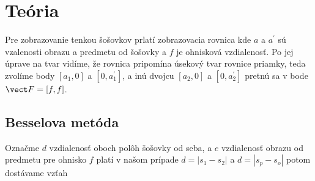 \section{Teória}

Pre zobrazovanie tenkou šošovkov prlatí zobrazovacia rovnica
kde $a$ a $a^\prime$ sú vzalenosti obrazu a predmetu od šošovky a $f$ je ohnisková vzdialenosť.
Po jej úprave na tvar
vidíme, že rovnica pripomína úsekový tvar rovnice priamky, teda zvolíme body $[a_1,0]$ a $[0,a_1^\prime]$, a inú dvojcu $[a_2,0]$ a $[0,a_2^\prime]$ pretnú sa v bode $\vect F = [f,f]$.


\subsection{Besselova metóda}

Označme $d$ vzdialenosť oboch polôh šošovky od seba, a $e$ vzdialenosť obrazu od predmetu pre ohnisko $f$ platí
v našom prípade $d= |s_1-s_2|$ a $d= |s_p-s_o|$ potom dostávame vzťah



